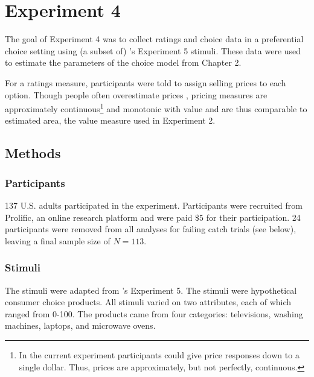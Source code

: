\section{Experiment 4}

The goal of Experiment 4 was to collect ratings and choice data in a preferential choice setting using (a subset of) \textcite{banerjeeFactorsThatPromote2024}'s Experiment 5 stimuli. These data were used to estimate the parameters of the choice model from Chapter 2. 

For a ratings measure, participants were told to assign selling prices to each option. Though people often overestimate prices \parencite{breidertREVIEWMETHODSMEASURING2006}, pricing measures are approximately continuous\footnote{In the current experiment participants could give price responses down to a single dollar. Thus, prices are approximately, but not perfectly, continuous.} and monotonic with value \parencite{miller2011should} and are thus comparable to estimated area, the value measure used in Experiment 2.

\subsection{Methods}

\subsubsection{Participants}
137 U.S. adults participated in the experiment. Participants were recruited from Prolific, an online research platform and were paid $\$5$ for their participation. 24 participants were removed from all analyses for failing catch trials (see below), leaving a final sample size of $N=113$. 

\subsubsection{Stimuli}

The stimuli were adapted from \textcite{banerjeeFactorsThatPromote2024}'s Experiment 5. The stimuli were hypothetical consumer choice products. All stimuli varied on two attributes, each of which ranged from 0-100. The products came from four categories: televisions, washing machines, laptops, and microwave ovens. 


